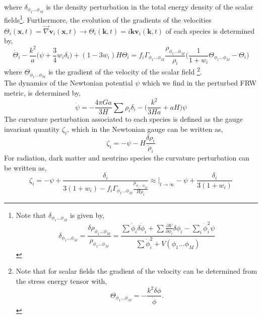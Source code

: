 \documentclass[11pt]{article}
\begin{document}
where $\delta_{\phi_1...\phi_M}$ is the density perturbation in the total energy density of the scalar fields\footnote{Note that $\delta_{\phi_1 ... \phi_M}$ is given by, 
\begin{equation}
\delta_{\phi_1...\phi_M} = \frac{\delta \rho_{\phi_1 ... \phi_M}}{\rho_{\phi_1 ... \phi_M}} = \frac{\sum \dot \phi_i \delta \dot \phi_i + \sum \frac{\partial V}{\partial \phi_i} \delta \phi_i - \sum_i \dot \phi_i^2 \psi}{\sum \dot \phi_i^2 +V(\phi_1...\phi_M)} 
\end{equation} 
}. Furthermore, the evolution of the gradients of the velocities $\Theta_i(\mathbf x, t) = \vec\nabla \mathbf v_i (\mathbf x, t) \longrightarrow \Theta_i(\mathbf k, t) = i\mathbf k \mathbf v_i(\mathbf k, t)$ of each species is determined by, 
\begin{equation}
\dot \Theta_i - \frac{k^2}{a} \bigg(\psi + \frac{3}{4} w_i \delta_i\bigg) + (1 - 3w_i) H \Theta_i = f_i  \Gamma_{\phi_1 ... \phi_M} \frac{\rho_{\phi_1 ... \phi_M}}{\rho_i} \bigg(\frac{1}{1+w_i}\Theta_{\phi_1 ... \phi_M} - \Theta_i \bigg)
\end{equation}
where $ \Theta_{\phi_1...\phi_M}$ is the gradient of the velocity of the scalar field \footnote{Note that for scalar fields the gradient of the velocity can be determined from the stress energy tensor with, \begin{equation}
\Theta_{\phi_1 ... \phi_M} = - \frac{k^2 \delta \phi}{\dot \phi}.
\end{equation}}. \\
\indent The dynamics of the Newtonian potential $\psi$ which we find in the perturbed FRW metric, is determined by, 
\begin{equation}
\dot \psi = -  \frac{4 \pi G a}{3H} \sum \rho_i \delta_i - \bigg(\frac{k^2}{3Ha} + aH\bigg) \psi
\end{equation}
The curvature perturbation associated to each species is defined as the gauge invariant quantity $\zeta_i$, which in the Newtonian gauge can be written as, 
\begin{equation}
\zeta_i = -\psi - H \frac{\delta \rho_i}{\dot \rho_i}
\end{equation}
For radiation, dark matter and neutrino species the curvature perturbation can be written as, 
\begin{equation}
\zeta_i = -\psi + \frac{\delta_i}{3(1+w_i) -  f_i \Gamma_{\phi_1 ... \phi_M} \frac{\rho_{\phi_1 ... \phi_M}}{H \rho_i}} \approx \bigg|_{t\rightarrow \infty} -\psi + \frac{\delta_i}{3(1+w_i)}
\end{equation}
\end{document}
